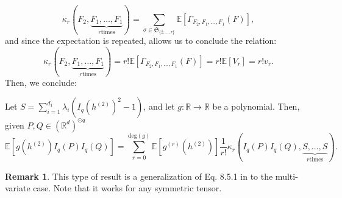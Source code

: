 \documentclass[]{article}
\numberwithin{equation}{section}
\theoremstyle{definition}
\newtheorem{remark}{Remark}[section]
\newcommand{\RR}{\mathbb{R}}
\newcommand{\EE}{\mathbb{E}}
\begin{document}
$$
\kappa_r(F_2, \underbrace{F_{1}, \dots, F_{1}}_{r \text{times}}) = \sum_{\sigma \in \mathfrak{S}_{\{2, \ldots, r\}}} \EE\left[\Gamma_{F_{2}, F_{1}, \ldots, F_{1}}(F)\right],
$$  
and since the expectation is repeated,  allows us to conclude the relation: 
\begin{equation}
    \kappa_r(F_2, \underbrace{F_{1}, \dots, F_{1}}_{r \text{times}}) = r! \EE\left[\Gamma_{F_{2}, F_{1}, \ldots, F_{1}}(F)\right] = r! \EE\left[ V_{r}\right ] = r! v_{r}. 
\end{equation}
Then, we conclude: 
\begin{lemma} Let $S = \sum_{i=1}^{d_1} \lambda_{i} (I_{q}(h^{(2)})^{2} -1)$, and let $g: \RR \to \RR$ be a polynomial. Then, given $P, Q \in (\RR^{d})^{\odot q}$
\[
\EE \left[ g(h^{(2)}) I_{q}(P) I_{q}(Q)\right ] = \sum_{r=0}^{\mathrm{deg}(g)} \EE \left[ g^{(r)}(h^{(2)})\right ] \dfrac{1}{r!}\kappa_r(I_{q}(P)I_{q}(Q), \underbrace{S, \dots, S}_{r \text{times}}).
 \]
 \label{lemma:exact_expectation_polynomial}
\end{lemma}

\begin{remark}
    This type of result is a generalization of Eq. 8.5.1 in \cite{nourdin2012normal} to the multi-variate case. Note that it works for any symmetric tensor. 
\end{remark}
\end{document}
